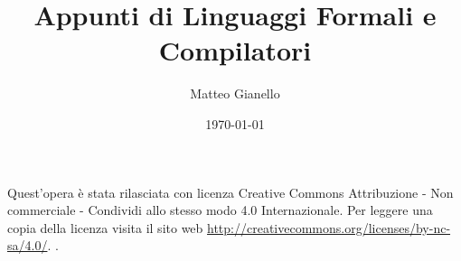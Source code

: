 \documentclass[a4paper,11pt, twoside]{article}
\title{Appunti di Linguaggi Formali e Compilatori}
\author{Matteo Gianello}
\date{\today}
\theoremstyle{definition}
\begin{document}
\pagestyle{empty}
\thispagestyle{empty}
\maketitle
\vspace{5cm}
\begin{center}
Quest'opera è stata rilasciata con licenza Creative Commons Attribuzione - Non commerciale - Condividi allo stesso modo 4.0 Internazionale. Per leggere una copia della licenza visita il sito web \url{http://creativecommons.org/licenses/by-nc-sa/4.0/}. \ccbyncsa.
\end{center}
\newpage

\thispagestyle{plain}
\tableofcontents
\newpage

\pagestyle{plain}


%
%
%
%
%
%
%

\newpage
\listoffigures
\end{document}
